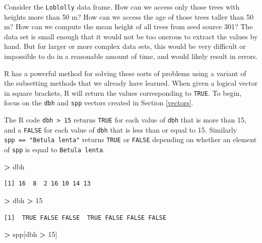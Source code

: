 \documentclass[]{krantz}
\makeatletter
\newenvironment{Shaded}{\begin{snugshade}}{\end{snugshade}}
\newcommand{\DecValTok}[1]{\textcolor[rgb]{0.06,0.06,0.06}{#1}}
\newcommand{\StringTok}[1]{\textcolor[rgb]{0.5,0.5,0.5}{#1}}
\newcommand{\OperatorTok}[1]{\textcolor[rgb]{0.43,0.43,0.43}{\textbf{#1}}}
\newcommand{\NormalTok}[1]{#1}
\newenvironment{kframe}{%
\medskip{}
\setlength{\fboxsep}{.8em}
 \def\at@end@of@kframe{}%
 \ifinner\ifhmode%
  \def\at@end@of@kframe{\end{minipage}}%
  \begin{minipage}{\columnwidth}%
 \fi\fi%
 \def\FrameCommand##1{\hskip\@totalleftmargin \hskip-\fboxsep
 \colorbox{shadecolor}{##1}\hskip-\fboxsep
     \hskip-\linewidth \hskip-\@totalleftmargin \hskip\columnwidth}%
 \MakeFramed {\advance\hsize-\width
   \@totalleftmargin\z@ \linewidth\hsize
   \@setminipage}}%
 {\par\unskip\endMakeFramed%
 \at@end@of@kframe}
\renewenvironment{Shaded}{\begin{kframe}}{\end{kframe}}
\theoremstyle{definition}
\theoremstyle{definition}
\theoremstyle{definition}
\theoremstyle{remark}
\makeatother
\begin{document}
Consider the \texttt{Loblolly} data frame. How can we access only those
trees with heights more than 50 m? How can we access the age of those
trees taller than 50 m? How can we compute the mean height of all trees
from seed source 301? The data set is small enough that it would not be
too onerous to extract the values by hand. But for larger or more
complex data sets, this would be very difficult or impossible to do in a
reasonable amount of time, and would likely result in errors.

R has a powerful method for solving these sorts of problems using a
variant of the subsetting methods that we already have learned. When
given a logical vector in square brackets, R will return the values
corresponding to \texttt{TRUE}. To begin, focus on the \texttt{dbh} and
\texttt{spp} vectors created in Section \ref{vectors}.

The R code \texttt{dbh\ \textgreater{}\ 15} returns \texttt{TRUE} for
each value of \texttt{dbh} that is more than 15, and a \texttt{FALSE}
for each value of \texttt{dbh} that is less than or equal to 15.
Similarly \texttt{spp\ ==\ "Betula\ lenta"} returns \texttt{TRUE} or
\texttt{FALSE} depending on whether an element of \texttt{spp} is equal
to \texttt{Betula\ lenta}.

\begin{Shaded}
\begin{Highlighting}[]
\OperatorTok{>}\StringTok{ }\NormalTok{dbh}
\end{Highlighting}
\end{Shaded}

\begin{verbatim}
[1] 16  8  2 16 10 14 13
\end{verbatim}

\begin{Shaded}
\begin{Highlighting}[]
\OperatorTok{>}\StringTok{ }\NormalTok{dbh }\OperatorTok{>}\StringTok{ }\DecValTok{15}
\end{Highlighting}
\end{Shaded}

\begin{verbatim}
[1]  TRUE FALSE FALSE  TRUE FALSE FALSE FALSE
\end{verbatim}

\begin{Shaded}
\begin{Highlighting}[]
\OperatorTok{>}\StringTok{ }\NormalTok{spp[dbh }\OperatorTok{>}\StringTok{ }\DecValTok{15}\NormalTok{]}
\end{Highlighting}
\end{Shaded}
\end{document}
